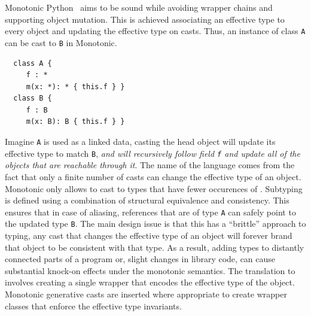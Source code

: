 \documentclass[a4paper,USenglish]{tex/lipics-v2016}
\newcommand{\code}[1]{{\tt #1}\xspace}
\begin{document}
Monotonic Python~\cite{Siek2015} aims to be sound while avoiding wrapper
chains and supporting object mutation. This is achieved associating an
effective type to every object and updating the effective type on casts.
Thus, an instance of class \code A can be cast to \code B in Monotonic.

\begin{lstlisting}
  class A {
     f : *
     m(x: *): * { this.f } }
  class B {
     f : B
     m(x: B): B { this.f } }
\end{lstlisting}

\noindent
Imagine \code A is used as a linked data, casting the head object will
update its effective type to match \code B, \emph{and will recursively
  follow field \code f and update all of the objects that are reachable
  through it}. The name of the language comes from the fact that only a
finite number of casts can change the effective type of an object. Monotonic
only allows to cast to types that have fewer occurences of \any.  Subtyping
is defined using a combination of structural equivalence and consistency.
This ensures that in case of aliasing, references that are of type \code A
can safely point to the updated type \code B.  The main design issue is that
this has a ``brittle'' approach to typing, any cast that changes the
effective type of an object will forever brand that object to be consistent
with that type. As a result, adding types to distantly connected parts of a
program or, slight changes in library code, can cause substantial knock-on
effects under the monotonic semantics.  The translation to \kafka involves
creating a single wrapper that encodes the effective type of the object.
Monotonic generative casts are inserted where appropriate to create wrapper
classes that enforce the effective type invariants. 
\end{document}
